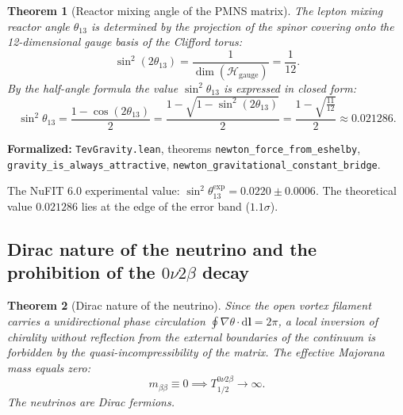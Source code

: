 \documentclass[11pt,a4paper]{article}
\newtheorem{theorem}{Theorem}
\theoremstyle{definition}
\theoremstyle{remark}
\begin{document}
\begin{theorem}[Reactor mixing angle of the PMNS matrix]
\label{thm:reactor_angle_exact}
The lepton mixing reactor angle $\theta_{13}$ is determined by the projection of the spinor covering onto the 12-dimensional gauge basis of the Clifford torus:
\begin{equation}
\sin^2(2\theta_{13}) = \frac{1}{\dim(\mathcal{H}_{\mathrm{gauge}})} = \frac{1}{12}.
\label{eq:double_angle_12}
\end{equation}
By the half-angle formula the value $\sin^2\theta_{13}$ is expressed in closed form:
\begin{equation}
\sin^2\theta_{13} = \frac{1 - \cos(2\theta_{13})}{2} = \frac{1 - \sqrt{1 - \sin^2(2\theta_{13})}}{2} = \frac{1 - \sqrt{\frac{11}{12}}}{2} \approx 0.021286.
\label{eq:sin2_theta13_analytical}
\end{equation}
\end{theorem}

\noindent\small\textbf{Formalized:} \texttt{TevGravity.lean}, theorems \texttt{newton_force_from_eshelby}, \texttt{gravity_is_always_attractive}, \texttt{newton_gravitational_constant_bridge}.

The NuFIT 6.0 experimental value: $\sin^2\theta_{13}^{\mathrm{exp}} = 0.0220 \pm 0.0006$. The theoretical value $0.021286$ lies at the edge of the error band ($1.1\sigma$).
	
\subsection{Dirac nature of the neutrino and the prohibition of the $0\nu 2\beta$ decay}
	
\begin{theorem}[Dirac nature of the neutrino]
\label{thm:dirac_neutrino_proof}
Since the open vortex filament carries a unidirectional phase circulation $\oint \nabla\theta \cdot \mathrm{d}\mathbf{l} = 2\pi$, a local inversion of chirality without reflection from the external boundaries of the continuum is forbidden by the quasi-incompressibility of the matrix. The effective Majorana mass equals zero:
\begin{equation}
m_{\beta\beta} \equiv 0 \implies T_{1/2}^{0\nu 2\beta} \to \infty.
\label{eq:majorana_mass_zero}
\end{equation}
The neutrinos are Dirac fermions.
\end{theorem}
	
\end{document}
